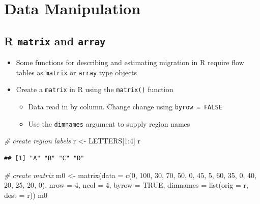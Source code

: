\documentclass[
]{book}
\newenvironment{Shaded}{\begin{snugshade}}{\end{snugshade}}
\newcommand{\AttributeTok}[1]{\textcolor[rgb]{0.77,0.63,0.00}{#1}}
\newcommand{\CommentTok}[1]{\textcolor[rgb]{0.56,0.35,0.01}{\textit{#1}}}
\newcommand{\ConstantTok}[1]{\textcolor[rgb]{0.00,0.00,0.00}{#1}}
\newcommand{\DecValTok}[1]{\textcolor[rgb]{0.00,0.00,0.81}{#1}}
\newcommand{\FunctionTok}[1]{\textcolor[rgb]{0.00,0.00,0.00}{#1}}
\newcommand{\NormalTok}[1]{#1}
\newcommand{\OtherTok}[1]{\textcolor[rgb]{0.56,0.35,0.01}{#1}}
\newcommand{\SpecialCharTok}[1]{\textcolor[rgb]{0.00,0.00,0.00}{#1}}
\providecommand{\tightlist}{%
  \setlength{\itemsep}{0pt}\setlength{\parskip}{0pt}}
\begin{document}
\hypertarget{data-manipulation}{%
\section{Data Manipulation}\label{data-manipulation}}

\hypertarget{r-matrix-and-array}{%
\subsection{\texorpdfstring{R \texttt{matrix} and \texttt{array}}{R matrix and array}}\label{r-matrix-and-array}}

\begin{itemize}
\tightlist
\item
  Some functions for describing and estimating migration in R require flow tables as \texttt{matrix} or \texttt{array} type objects
\item
  Create a \texttt{matrix} in R using the \texttt{matrix()} function

  \begin{itemize}
  \tightlist
  \item
    Data read in by column. Change change using \texttt{byrow\ =\ FALSE}
  \item
    Use the \texttt{dimnames} argument to supply region names
  \end{itemize}
\end{itemize}

\begin{Shaded}
\begin{Highlighting}[]
\CommentTok{\# create region labels}
\NormalTok{r }\OtherTok{\textless{}{-}}\NormalTok{ LETTERS[}\DecValTok{1}\SpecialCharTok{:}\DecValTok{4}\NormalTok{]}
\NormalTok{r}
\end{Highlighting}
\end{Shaded}

\begin{verbatim}
## [1] "A" "B" "C" "D"
\end{verbatim}

\begin{Shaded}
\begin{Highlighting}[]
\CommentTok{\# create matrix}
\NormalTok{m0 }\OtherTok{\textless{}{-}} \FunctionTok{matrix}\NormalTok{(}\AttributeTok{data =} \FunctionTok{c}\NormalTok{(}\DecValTok{0}\NormalTok{, }\DecValTok{100}\NormalTok{, }\DecValTok{30}\NormalTok{, }\DecValTok{70}\NormalTok{, }\DecValTok{50}\NormalTok{, }\DecValTok{0}\NormalTok{, }\DecValTok{45}\NormalTok{, }\DecValTok{5}\NormalTok{, }\DecValTok{60}\NormalTok{, }\DecValTok{35}\NormalTok{, }\DecValTok{0}\NormalTok{, }\DecValTok{40}\NormalTok{, }\DecValTok{20}\NormalTok{, }\DecValTok{25}\NormalTok{, }\DecValTok{20}\NormalTok{, }\DecValTok{0}\NormalTok{), }
             \AttributeTok{nrow =} \DecValTok{4}\NormalTok{, }\AttributeTok{ncol =} \DecValTok{4}\NormalTok{, }\AttributeTok{byrow =} \ConstantTok{TRUE}\NormalTok{,}
             \AttributeTok{dimnames =} \FunctionTok{list}\NormalTok{(}\AttributeTok{orig =}\NormalTok{ r, }\AttributeTok{dest =}\NormalTok{ r))}
\NormalTok{m0}
\end{Highlighting}
\end{Shaded}
\end{document}
